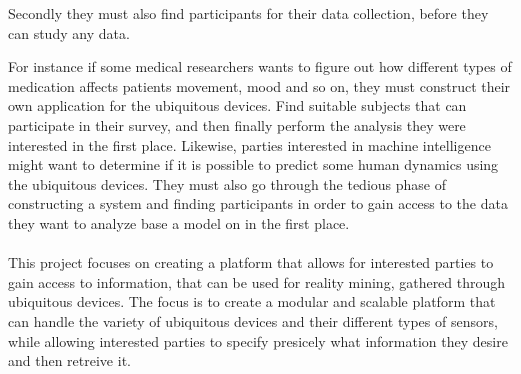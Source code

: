 Secondly they must also find participants for their data collection, before they can study any data. 




For instance if some medical researchers wants to figure out how different types of medication affects patients movement, mood and so on, they must construct their own application for the ubiquitous devices. Find suitable subjects that can participate in their survey, and then finally perform the analysis they were interested in the first place. Likewise, parties interested in machine intelligence might want to determine if it is possible to predict some human dynamics using the ubiquitous devices. They must also go through the tedious phase of constructing a system and finding participants in order to gain access to the data they want to analyze base a model on in the first place.
\\\\
This project focuses on creating a platform that allows for interested parties to gain access to information, that can be used for reality mining, gathered through ubiquitous devices. The focus is to create a modular and scalable platform that can handle the variety of ubiquitous devices and their different types of sensors, while allowing interested parties to specify presicely what information they desire and then retreive it.



